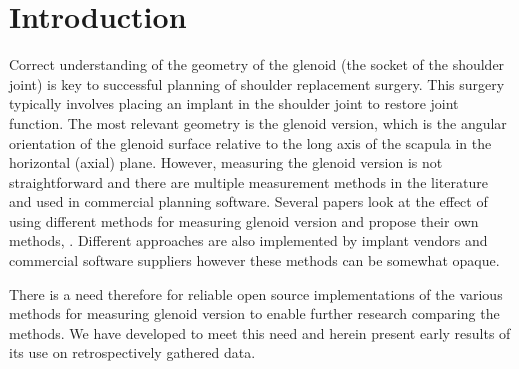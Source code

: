 \section{Introduction}
\label{sec:introduction}
Correct understanding of the geometry of the glenoid (the socket of the shoulder joint) is
key to successful planning of shoulder replacement surgery. This surgery typically involves
placing an implant in the shoulder joint to restore joint function. The most relevant
geometry is the glenoid version, which is the angular orientation of the glenoid surface
relative to the long axis of the scapula in the horizontal (axial) plane. 
However, measuring the glenoid version is not
straightforward and there are multiple measurement methods in the literature and used in
commercial planning software. Several papers look at the effect of using 
different methods for measuring glenoid version and propose their own 
methods, \cite{PMID:33330245, PMID:32010231, PMID:29298261, PMID:33554174}. 
Different approaches are also implemented by implant vendors and commercial 
software suppliers \cite{blueprint, exactech, djosurgical} however these methods can 
be somewhat opaque.

There is a need therefore for reliable open source implementations of the various 
methods for measuring glenoid version to enable further research comparing the methods. 
We have developed \sksglenoid to meet this need and herein present early results of its 
use on retrospectively gathered data.
